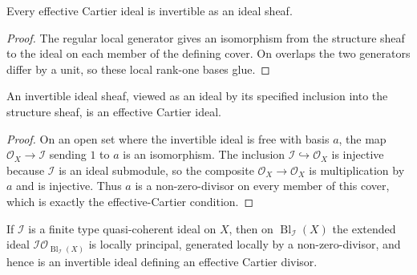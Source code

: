 \begin{lemma}
  \label{lemma:nagata-effective-cartier-is-invertible}

  Every effective Cartier ideal is invertible as an ideal sheaf.
\end{lemma}

\begin{proof}
  The regular local generator gives an isomorphism from the structure sheaf
  to the ideal on each member of the defining cover.  On overlaps the two
  generators differ by a unit, so these local rank-one bases glue.
\end{proof}

\begin{lemma}
  \label{lemma:nagata-invertible-ideal-is-effective-cartier}

  An invertible ideal sheaf, viewed as an ideal by its specified inclusion into
  the structure sheaf, is an effective Cartier ideal.
\end{lemma}

\begin{proof}
  On an open set where the invertible ideal is free with basis $a$, the map
  $\mathcal O_X\to\mathcal I$ sending $1$ to $a$ is an isomorphism.  The
  inclusion $\mathcal I\hookrightarrow\mathcal O_X$ is injective because
  $\mathcal I$ is an ideal submodule, so the composite
  $\mathcal O_X\to\mathcal O_X$ is multiplication by $a$ and is injective.
  Thus $a$ is a non-zero-divisor on every member of this cover, which is
  exactly the effective-Cartier condition.
\end{proof}

\begin{theorem}
  \label{thm:nagata-blowup-principalizes-center}

  If $\mathcal I$ is a finite type quasi-coherent ideal on $X$, then on
  $\operatorname{Bl}_{\mathcal I}(X)$ the extended ideal
  $\mathcal I\mathcal O_{\operatorname{Bl}_{\mathcal I}(X)}$ is locally
  principal, generated locally by a non-zero-divisor, and hence is an
  invertible ideal defining an effective Cartier divisor.
\end{theorem}


